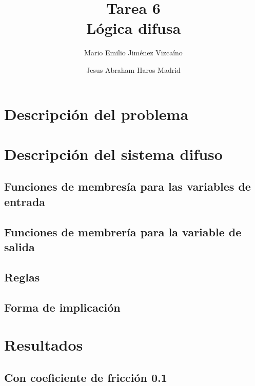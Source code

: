 \documentclass[sigconf,authorversion,nonacm]{acmart}
\begin{document}
\title{Tarea 6 \\ Lógica difusa}

\author{Mario Emilio Jiménez Vizcaíno}
\affiliation{}

\author{Jesus Abraham Haros Madrid}
\affiliation{}


\maketitle

\section{Descripción del problema}


\section{Descripción del sistema difuso}

\subsection{Funciones de membresía para las variables de entrada}

\subsection{Funciones de membrería para la variable de salida}

\subsection{Reglas}

\subsection{Forma de implicación}

\section{Resultados}
\subsection{Con coeficiente de fricción 0.1}
\end{document}
